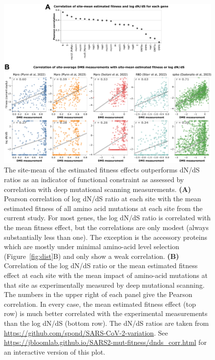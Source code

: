\documentclass[9pt,twocolumn,twoside]{gsajnl_modified}
\begin{document}
\begin{figure}[h]
\centering
\includegraphics[width=\linewidth]{figs/dnds.png}
\caption{
The site-mean of the estimated fitness effects outperforms dN/dS ratios as an indicator of functional constraint as assessed by correlation with deep mutational scanning measurements.
{\bf (A)}
Pearson correlation of log dN/dS ratio at each site with the mean estimated fitness of all amino acid mutations at each site from the current study.
For most genes, the log dN/dS ratio is correlated with the mean fitness effect, but the correlations are only modest (always substantially less than one).
The exception is the accessory proteins which are mostly under minimal amino-acid level selection (Figure~\ref{fig:dist}B) and only show a weak correlation.
{\bf (B)}
Correlation of the log dN/dS ratio or the mean estimated fitness effect at each site with the mean impact of amino-acid mutations at that site as experimentally measured by deep mutational scanning.
The numbers in the upper right of each panel give the Pearson correlation.
In every case, the mean estimated fitness effect (top row) is much better correlated with the experimental measurements than the log dN/dS (bottom row).
The dN/dS ratios are taken from \url{https://github.com/spond/SARS-CoV-2-variation}.
See \url{https://jbloomlab.github.io/SARS2-mut-fitness/dnds_corr.html} for an interactive version of this plot.
\label{fig:dnds}
}
\end{figure}
\end{document}
